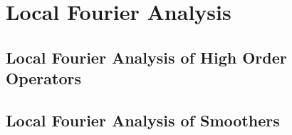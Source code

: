 \chapter{Local Fourier Analysis}\label{ch:LocalFourierAnalysis}


\section{Local Fourier Analysis of High Order Operators}\label{sec:lfahighorder}


\section{Local Fourier Analysis of Smoothers}\label{sec:lfasmoothers}

